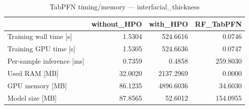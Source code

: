 \begin{table}
\caption{TabPFN timing/memory --- interfacial_thickness}
\label{tab:timing_interfacial_thickness}
\begin{tabular}{lrrr}
\toprule
 & without_HPO & with_HPO & RF_TabPFN \\
\midrule
Training wall time [s] & 1.5304 & 524.6616 & 0.0746 \\
Training GPU time [s] & 1.5305 & 524.6636 & 0.0747 \\
Per-sample inference [ms] & 0.7359 & 0.4858 & 259.8030 \\
Used RAM [MB] & 32.0020 & 2137.2969 & 0.0000 \\
GPU memory [MB] & 86.1235 & 4896.6036 & 34.6030 \\
Model size [MB] & 87.8565 & 52.6012 & 154.0955 \\
\bottomrule
\end{tabular}
\end{table}

